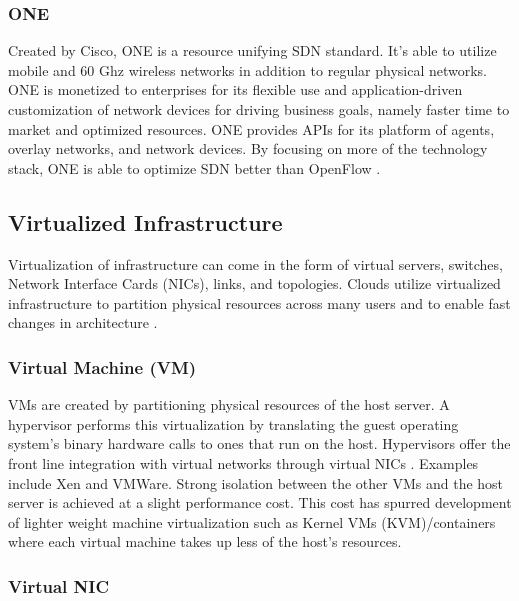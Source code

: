\documentclass[12pt]{article}
\begin{document}
\subsubsection{ONE}

Created by Cisco, ONE \cite{ciscoone} is a resource unifying SDN standard. It's able to utilize mobile and 60 Ghz wireless networks in addition to regular physical networks. ONE is monetized to enterprises for its flexible use and application-driven customization of network devices for driving business goals, namely faster time to market and optimized resources. ONE provides APIs for its platform of agents, overlay networks, and network devices. By focusing on more of the technology stack, ONE is able to optimize SDN better than OpenFlow \cite{wang2015survey}.



\subsection{Virtualized Infrastructure}

Virtualization of infrastructure can come in the form of virtual servers, switches, Network Interface Cards (NICs), links, and topologies. Clouds utilize virtualized infrastructure to partition physical resources across many users and to enable fast changes in architecture \cite{wang2015survey}.


\subsubsection{Virtual Machine (VM)}

VMs are created by partitioning physical resources of the host server. A hypervisor performs this virtualization by translating the guest operating system's binary hardware calls to ones that run on the host. Hypervisors offer the front line integration with virtual networks through virtual NICs \cite{wang2015survey}. Examples include Xen and VMWare. Strong isolation between the other VMs and the host server is achieved at a slight performance cost. This cost has spurred development of lighter weight machine virtualization such as Kernel VMs (KVM)/containers \cite{oci,docker} where each virtual machine takes up less of the host's resources.

\subsubsection{Virtual NIC}
\end{document}
